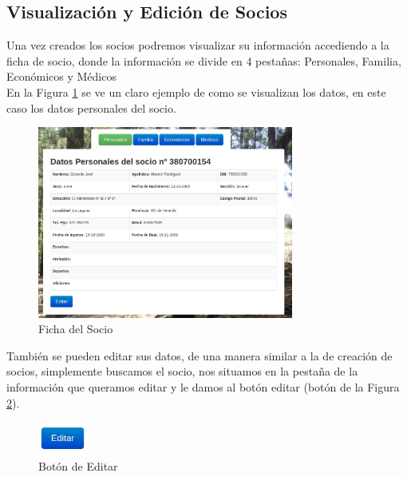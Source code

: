 \subsection{Visualización y Edición de Socios}

Una vez creados los socios podremos visualizar su información accediendo a la ficha de socio, donde la información se divide en 4 pestañas: Personales, Familia, Económicos y Médicos \\

En la Figura \ref{fig:ficha_socio} se ve un claro ejemplo de como se visualizan los datos, en este caso los datos personales del socio.\\

\begin{figure}[H]
\begin{center}
\includegraphics[width=0.75\textwidth]{images/datos_personales.jpg}
\caption{Ficha del Socio}
\label{fig:ficha_socio}
\end{center}
\end{figure}

También se pueden editar sus datos, de una manera similar a la de creación de socios, simplemente buscamos el socio, nos situamos en la pestaña de la información que queramos editar y le damos al botón  editar (botón de la Figura \ref{fig:edit}).

\begin{figure}[H]
\begin{center}
\includegraphics[width=0.15\textwidth]{images/boton_editar.jpg}
\caption{Botón de Editar}
\label{fig:edit}
\end{center}
\end{figure}

